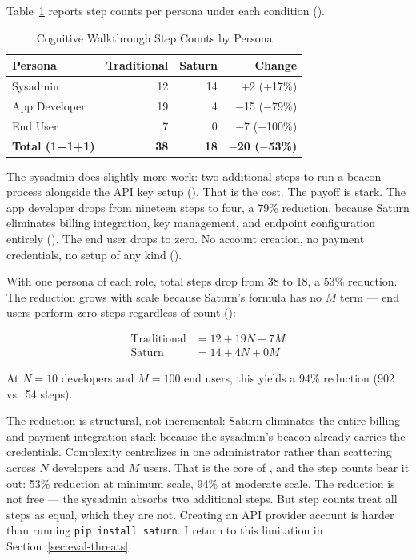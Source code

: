 Table~\ref{tab:eval-cog} reports step counts per persona under each condition ().

\begin{table}[ht]
\centering
\caption{Cognitive Walkthrough Step Counts by Persona}
\label{tab:eval-cog}
\begin{tabular}{l r r r}
\hline
\textbf{Persona} & \textbf{Traditional} & \textbf{Saturn} & \textbf{Change} \\
\hline
Sysadmin & 12 & 14 & +2 (+17\%) \\
App Developer & 19 & 4 & $-$15 ($-$79\%) \\
End User & 7 & 0 & $-$7 ($-$100\%) \\
\hline
\textbf{Total (1+1+1)} & \textbf{38} & \textbf{18} & $-$\textbf{20 ($-$53\%)} \\
\hline
\end{tabular}
\end{table}

The sysadmin does slightly more work: two additional steps to run a beacon process alongside the API key setup (). That is the cost. The payoff is stark. The app developer drops from nineteen steps to four, a 79\% reduction, because Saturn eliminates billing integration, key management, and endpoint configuration entirely (). The end user drops to zero. No account creation, no payment credentials, no setup of any kind ().

With one persona of each role, total steps drop from 38 to 18, a 53\% reduction. The reduction grows with scale because Saturn's formula has no $M$ term --- end users perform zero steps regardless of count ():

\begin{align*}
\text{Traditional} &= 12 + 19N + 7M \\
\text{Saturn} &= 14 + 4N + 0M
\end{align*}

At $N = 10$ developers and $M = 100$ end users, this yields a 94\% reduction (902 vs.\ 54 steps).

The reduction is structural, not incremental: Saturn eliminates the entire billing and payment integration stack because the sysadmin's beacon already carries the credentials. Complexity centralizes in one administrator rather than scattering across $N$ developers and $M$ users. That is the core of , and the step counts bear it out: 53\% reduction at minimum scale, 94\% at moderate scale. The reduction is not free --- the sysadmin absorbs two additional steps. But step counts treat all steps as equal, which they are not. Creating an API provider account is harder than running \texttt{pip install saturn}. I return to this limitation in Section~\ref{sec:eval-threats}.


